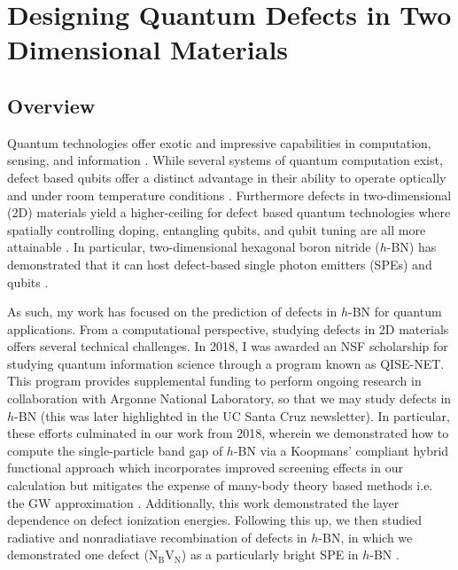 \chapter{Designing Quantum Defects in Two Dimensional Materials}

\section{Overview}
Quantum technologies offer exotic and impressive capabilities in computation, sensing, and information \cite{malik2019science}. While several systems of quantum computation exist, defect based qubits offer a distinct advantage in their ability to operate optically and under room temperature conditions \cite{koehl2011room,weber2010quantum,falk2013polytype}. Furthermore defects in two-dimensional (2D) materials yield a higher-ceiling for defect based quantum technologies where spatially controlling doping, entangling qubits, and qubit tuning are all more attainable \cite{aharonovich2017quantum,sajid2020single}. In particular, two-dimensional hexagonal boron nitride ($h$-BN) has demonstrated that it can host defect-based single photon emitters (SPEs) \cite{grosso2017tunable} and qubits \cite{gottscholl2020initialization}.

As such, my work has focused on the prediction of defects in $h$-BN for quantum applications. From a computational perspective, studying defects in 2D materials offers several technical challenges. In 2018, I was awarded an NSF scholarship for studying quantum information science through a program known as QISE-NET. This program provides supplemental funding to perform ongoing research in collaboration with Argonne National Laboratory, so that we may study defects in $h$-BN (this was later highlighted in the UC Santa Cruz newsletter). In particular, these efforts culminated in our work from 2018, wherein we demonstrated how to compute the single-particle band gap of $h$-BN via a Koopmans' compliant hybrid functional approach which incorporates improved screening effects in our calculation but mitigates the expense of many-body theory based methods i.e. the GW approximation \cite{smart2018fundamental}. Additionally, this work demonstrated the layer dependence on defect ionization energies. Following this up, we then studied radiative and nonradiatiave recombination of defects in $h$-BN, in which we demonstrated one defect (N$_\text{B}$V$_\text{N}$) as a particularly bright SPE in $h$-BN \cite{wu2019carrier}.

